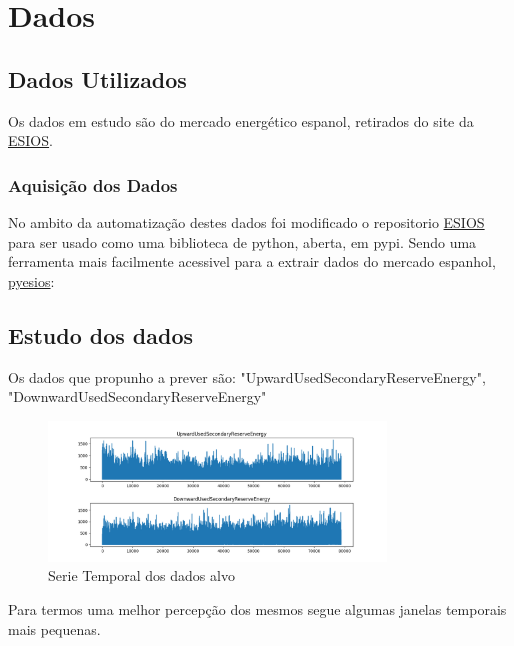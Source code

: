 \chapter{Dados}

\section{Dados Utilizados \label{se:dados_crus}}

Os dados em estudo são do mercado energético espanol, retirados do site da \href{https://www.esios.ree.es/es}{ESIOS}.




\subsection{Aquisição dos Dados}

No ambito da automatização destes dados foi modificado o repositorio \href{https://github.com/SanPen/ESIOS}{ESIOS} para ser usado como uma biblioteca de python, aberta, em pypi.
Sendo uma ferramenta mais facilmente acessivel para a extrair dados do mercado espanhol, \href{https://pypi.org/project/pyesios/}{pyesios}:



\section{Estudo dos dados  \label{se:dados_estudo}}

Os dados que propunho a prever são: "UpwardUsedSecondaryReserveEnergy", "DownwardUsedSecondaryReserveEnergy"

\begin{figure}[H]
  \centering
  \includegraphics[width=0.8\textwidth]{../plots/targets_timeseries.png}
  \caption{Serie Temporal dos dados alvo}
  \label{fig:target_timeseries}
\end{figure}

Para termos uma melhor percepção dos mesmos segue algumas janelas temporais mais pequenas.

